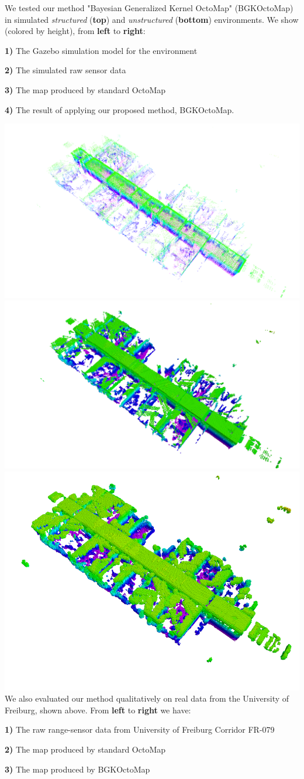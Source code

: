 \documentclass[portrait,final,archD,fontscale=0.477]{baposter}
\begin{document}
\begin{poster}
{We tested our method "Bayesian Generalized Kernel OctoMap" (BGKOctoMap) in simulated \textit{structured} (\textbf{top}) and \textit{unstructured} (\textbf{bottom}) environments. We show (colored by height), from \textbf{left} to \textbf{right}: 

\textbf{1)} The Gazebo simulation model for the environment

\textbf{2)} The simulated raw sensor data

\textbf{3)} The map produced by standard OctoMap

\textbf{4)} The result of applying our proposed method, BGKOctoMap.

\vspace{0.1em}

{
\includegraphics[width=0.3\linewidth]{img/fr_corridor_raw}
\includegraphics[width=0.3\linewidth]{img/fr_corridor_octomap}
\includegraphics[width=0.3\linewidth]{img/fr_corri2}
}
\\

We also evaluated our method qualitatively on real data from the University of Freiburg, shown above. From \textbf{left} to \textbf{right} we have:

\textbf{1)} The raw range-sensor data from University of Freiburg Corridor FR-079

\textbf{2)} The map produced by standard OctoMap

\textbf{3)} The map produced by BGKOctoMap

\vspace{0.1em}
\begin{multicols}{2}

\hfill \\


\end{multicols}}
\end{poster}
\end{document}
